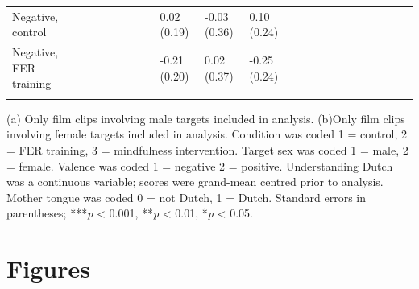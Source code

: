 \documentclass[authordate, empirical, issue]{jote-new-article}
\begin{document}
\begin{table}
{\begin{tabular}{@{} p{4em} l l l l l l l l l l l l l l l l l l l l l @{}}
      Negative, control                                             &                &                &                &                            &                            &                &                & 0.02 (0.19)    & -0.03 (0.36)               & 0.10 (0.24)                &                &                \\

      Negative, FER training                                        &                &                &                &                            &                            &                &                & -0.21 (0.20)   & 0.02 (0.37)                & -0.25 (0.24)               &                &                \\

      \bottomrule
      \\
    \end{tabular}}
  (a) Only film clips involving male targets included in analysis. (b)Only film clips involving female targets included in analysis. Condition was coded 1 = control, 2 = FER training, 3 = mindfulness intervention. Target sex was coded 1 = male, 2 = female. Valence was coded 1 = negative 2 = positive. Understanding Dutch was a continuous variable; scores were grand-mean centred prior to analysis. Mother tongue was coded 0 = not Dutch, 1 = Dutch. Standard errors in parentheses; ***\emph{p} < 0.001, **\emph{p} < 0.01, *\emph{p} < 0.05.
\end{table}

\clearpage







\section{Figures}
\end{document}
